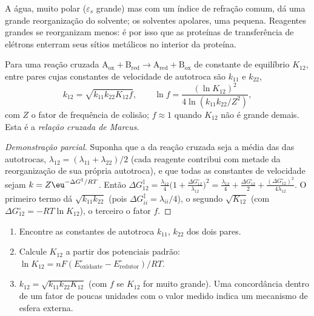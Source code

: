 \admitted

A água, muito polar ($\varepsilon_s$ grande) mas com um índice de refração comum, dá uma grande
reorganização do solvente; os solventes apolares, uma pequena. Reagentes grandes
se reorganizam menos: é por isso que as proteínas de transferência de elétrons enterram seus sítios metálicos
no interior da proteína.

\begin{theorem}\label{thm:b3:complex-mechanisms:cross-relation}
Para uma reação cruzada $\mathrm{A_{ox} + B_{red} \to A_{red} + B_{ox}}$ de constante de equilíbrio $K_{12}$, entre pares
cujas constantes de velocidade de autotroca são $k_{11}$ e $k_{22}$,
\[
  k_{12} = \sqrt{k_{11}k_{22}K_{12}f}, \qquad \ln f = \frac{(\ln K_{12})^2}{4\ln(k_{11}k_{22}/Z^2)},
\]
com $Z$ o fator de frequência de colisão; $f \approx 1$ quando $K_{12}$ não é grande demais. Esta é a
\emph{relação cruzada de Marcus}.
\end{theorem}

\begin{proof}[Demonstração parcial]
Suponha que a  da reação cruzada seja a média das das
autotrocas, $\lambda_{12} = (\lambda_{11} + \lambda_{22})/2$ (cada reagente contribui com metade da reorganização de sua
própria autotroca), e que todas as constantes de velocidade sejam $k = Z\eu^{-\Delta G^{\ddagger}/RT}$. Então
$\Delta G_{12}^{\ddagger} = \frac{\lambda_{12}}{4}\bigl(1 + \frac{\Delta G^\circ_{12}}{\lambda_{12}}\bigr)^2 = \frac{\lambda_{12}}{4} + \frac{\Delta G^\circ_{12}}{2} + \frac{(\Delta G^\circ_{12})^2}{4\lambda_{12}}$. O primeiro termo dá
$\sqrt{k_{11}k_{22}}$ (pois $\Delta G^{\ddagger}_{ii} = \lambda_{ii}/4$), o segundo $\sqrt{K_{12}}$ (com $\Delta G^\circ_{12} = -RT\ln K_{12}$), o terceiro
o fator $f$.
\end{proof}

\begin{method}\label{met:b3:complex-mechanisms:marcus-estimate}
\begin{enumerate}
  \item Encontre as constantes de autotroca $k_{11}$, $k_{22}$ dos dois pares.
  \item Calcule $K_{12}$ a partir dos potenciais padrão: $\ln K_{12} = nF(E^\circ_{\text{oxidante}} - E^\circ_{\text{redutor}})/RT$.
  \item $k_{12} = \sqrt{k_{11}k_{22}K_{12}}$ (com $f$ se $K_{12}$ for muito grande). Uma concordância dentro de um fator
        de poucas unidades com o valor medido indica um mecanismo de esfera externa.
\end{enumerate}
\end{method}

